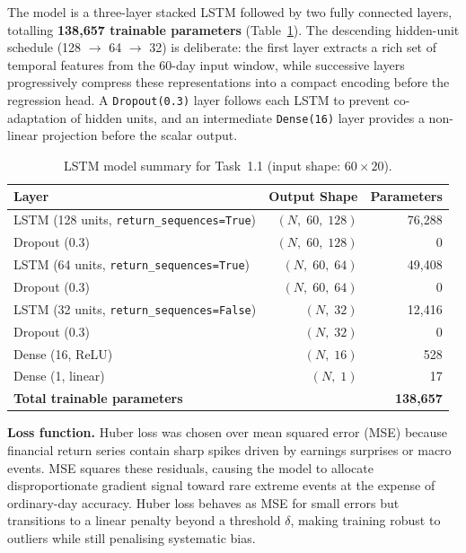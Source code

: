 \documentclass[12pt, a4paper]{article}
\begin{document}
The model is a three-layer stacked LSTM followed by two fully connected layers,
totalling \textbf{138,657 trainable parameters} (Table~\ref{tab:model_summary}).
The descending hidden-unit schedule (128 $\rightarrow$ 64 $\rightarrow$ 32)
is deliberate: the first layer extracts a rich set of temporal features from
the 60-day input window, while successive layers progressively compress these
representations into a compact encoding before the regression head.
A \texttt{Dropout(0.3)} layer follows each LSTM to prevent co-adaptation of
hidden units, and an intermediate \texttt{Dense(16)} layer provides a
non-linear projection before the scalar output.

\begin{table}[h]
\centering
\caption{LSTM model summary for Task~1.1 (input shape: $60 \times 20$).}
\label{tab:model_summary}
\renewcommand{\arraystretch}{1.3}
\begin{tabular}{lrr}
\hline
\textbf{Layer} & \textbf{Output Shape} & \textbf{Parameters} \\
\hline
LSTM (128 units, \texttt{return\_sequences=True})  & $(N,\;60,\;128)$ & 76,288  \\
Dropout (0.3)                                       & $(N,\;60,\;128)$ & 0       \\
LSTM (64 units, \texttt{return\_sequences=True})   & $(N,\;60,\;64)$  & 49,408  \\
Dropout (0.3)                                       & $(N,\;60,\;64)$  & 0       \\
LSTM (32 units, \texttt{return\_sequences=False})  & $(N,\;32)$       & 12,416  \\
Dropout (0.3)                                       & $(N,\;32)$       & 0       \\
Dense (16, ReLU)                                    & $(N,\;16)$       & 528     \\
Dense (1, linear)                                   & $(N,\;1)$        & 17      \\
\hline
\textbf{Total trainable parameters} & & \textbf{138,657} \\
\hline
\end{tabular}
\end{table}

\textbf{Loss function.} Huber loss was chosen over mean squared error (MSE)
because financial return series contain sharp spikes driven by earnings
surprises or macro events. MSE squares these residuals, causing the model to
allocate disproportionate gradient signal toward rare extreme events at the
expense of ordinary-day accuracy. Huber loss behaves as MSE for small errors
but transitions to a linear penalty beyond a threshold $\delta$, making
training robust to outliers while still penalising systematic bias.
\end{document}
